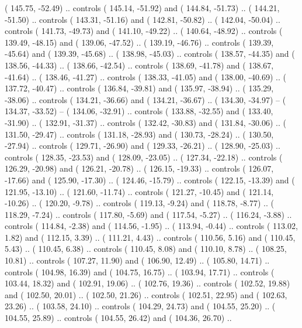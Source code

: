 {        ( 145.75, -52.49) .. controls ( 145.14, -51.92) and ( 144.84, -51.73) ..
        ( 144.21, -51.50) .. controls ( 143.31, -51.16) and ( 142.81, -50.82) ..
        ( 142.04, -50.04) .. controls ( 141.73, -49.73) and ( 141.10, -49.22) ..
        ( 140.64, -48.92) .. controls ( 139.49, -48.15) and ( 139.06, -47.52) ..
        ( 139.19, -46.76) .. controls ( 139.39, -45.64) and ( 139.39, -45.68) ..
        ( 138.98, -45.03) .. controls ( 138.57, -44.35) and ( 138.56, -44.33) ..
        ( 138.66, -42.54) .. controls ( 138.69, -41.78) and ( 138.67, -41.64) ..
        ( 138.46, -41.27) .. controls ( 138.33, -41.05) and ( 138.00, -40.69) ..
        ( 137.72, -40.47) .. controls ( 136.84, -39.81) and ( 135.97, -38.94) ..
        ( 135.29, -38.06) .. controls ( 134.21, -36.66) and ( 134.21, -36.67) ..
        ( 134.30, -34.97) -- 
        ( 134.37, -33.52) -- 
        ( 134.06, -32.91) .. controls ( 133.88, -32.55) and ( 133.40, -31.90) ..
        ( 132.91, -31.37) .. controls ( 132.42, -30.83) and ( 131.84, -30.06) ..
        ( 131.50, -29.47) .. controls ( 131.18, -28.93) and ( 130.73, -28.24) ..
        ( 130.50, -27.94) .. controls ( 129.71, -26.90) and ( 129.33, -26.21) ..
        ( 128.90, -25.03) .. controls ( 128.35, -23.53) and ( 128.09, -23.05) ..
        ( 127.34, -22.18) .. controls ( 126.29, -20.98) and ( 126.21, -20.78) ..
        ( 126.15, -19.33) .. controls ( 126.07, -17.66) and ( 125.90, -17.30) ..
        ( 124.46, -15.79) .. controls ( 122.15, -13.39) and ( 121.95, -13.10) ..
        ( 121.60, -11.74) .. controls ( 121.27, -10.45) and ( 121.14, -10.26) ..
        ( 120.20,  -9.78) .. controls ( 119.13,  -9.24) and ( 118.78,  -8.77) ..
        ( 118.29,  -7.24) .. controls ( 117.80,  -5.69) and ( 117.54,  -5.27) ..
        ( 116.24,  -3.88) .. controls ( 114.84,  -2.38) and ( 114.56,  -1.95) ..
        ( 113.94,  -0.44) .. controls ( 113.02,   1.82) and ( 112.15,   3.39) ..
        ( 111.21,   4.43) .. controls ( 110.56,   5.16) and ( 110.45,   5.43) ..
        ( 110.45,   6.38) .. controls ( 110.45,   8.08) and ( 110.10,   8.78) ..
        ( 108.25,  10.81) .. controls ( 107.27,  11.90) and ( 106.90,  12.49) ..
        ( 105.80,  14.71) .. controls ( 104.98,  16.39) and ( 104.75,  16.75) ..
        ( 103.94,  17.71) .. controls ( 103.44,  18.32) and ( 102.91,  19.06) ..
        ( 102.76,  19.36) .. controls ( 102.52,  19.88) and ( 102.50,  20.01) ..
        ( 102.50,  21.26) .. controls ( 102.51,  22.95) and ( 102.63,  23.26) ..
        ( 103.58,  24.10) .. controls ( 104.29,  24.73) and ( 104.55,  25.20) ..
        ( 104.55,  25.89) .. controls ( 104.55,  26.42) and ( 104.36,  26.70) ..
}
